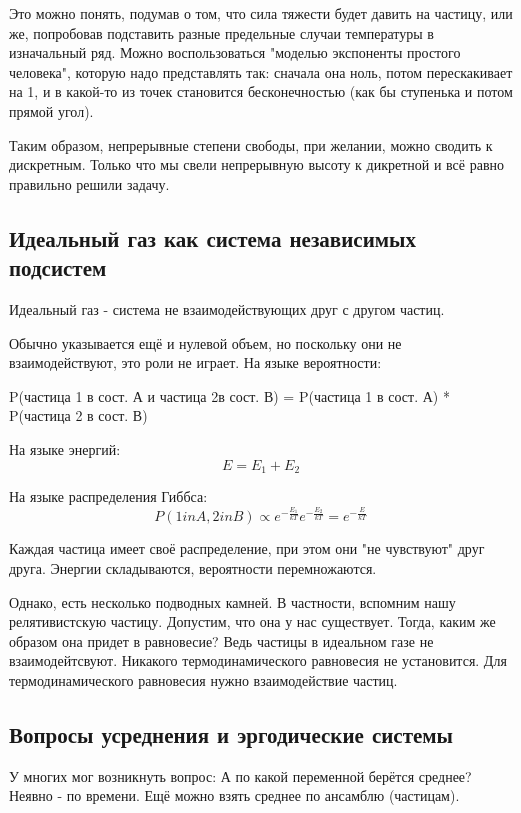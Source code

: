 \documentclass[a4paper, 12pt]{article}
\begin{document}
	Это можно понять, подумав о том, что сила тяжести будет давить на частицу, или же, попробовав подставить разные предельные случаи температуры в изначальный ряд. Можно воспользоваться "моделью экспоненты простого человека", которую надо представлять так: сначала она ноль, потом перескакивает на 1, и в какой-то из точек становится бесконечностью (как бы ступенька и потом прямой угол).
	
	Таким образом, непрерывные степени свободы, при желании, можно сводить к дискретным. Только что мы свели непрерывную высоту к дикретной и всё равно правильно решили задачу.
	
	\subsection{Идеальный газ как система независимых подсистем}
	Идеальный газ - система не взаимодействующих друг с другом частиц.
	
	Обычно указывается ещё и нулевой объем, но поскольку они не взаимодействуют, это роли не играет. На языке вероятности:
	
	P(частица 1 в сост. А и частица 2в сост. В) = P(частица 1 в сост. А) * P(частица 2 в сост. В)
	
	На языке энергий: 
	\begin{equation*}
		E = E_{1} + E_{2}
	\end{equation*}
	
	На языке распределения Гиббса:
	\begin{equation*}
		P(1 in A , 2 in B)  \propto{ e^{- \frac{E_{1}}{kT}}  e^{- \frac{E_{2}}{kT}}} =  e^{- \frac{E}{kT}}
	\end{equation*}
	
	Каждая частица имеет своё распределение, при этом они "не чувствуют" друг друга. Энергии складываются, вероятности перемножаются.
	
	Однако, есть несколько подводных камней. В частности, вспомним нашу релятивистскую частицу. Допустим, что она у нас существует. Тогда, каким же образом она придет в равновесие? Ведь частицы в идеальном газе не взаимодейтсвуют. Никакого термодинамического равновесия не установится. Для термодинамического равновесия нужно взаимодействие частиц. 
	\subsection{Вопросы усреднения и эргодические системы}
	У многих мог возникнуть вопрос: А по какой переменной берётся среднее? Неявно - по времени. Ещё можно взять среднее по ансамблю (частицам). 
	
\end{document}
